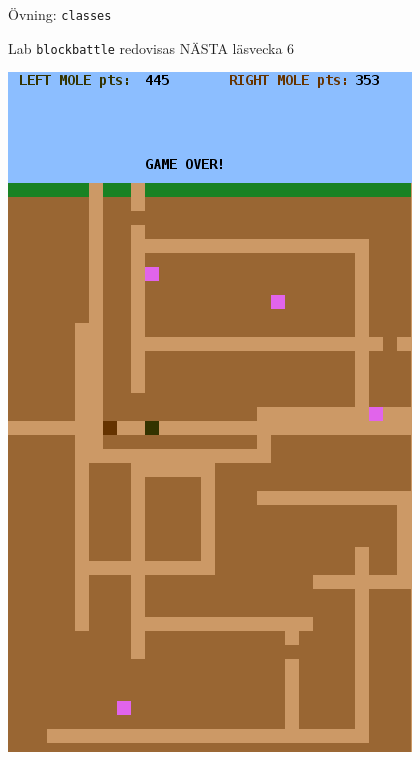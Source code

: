 

\ifkompendium\else

\begin{SlideExtra}{Övning: \texttt{classes}}
\begin{itemize}\SlideFontSmall

\end{itemize}
\end{SlideExtra}

\begin{SlideExtra}{Lab \texttt{blockbattle} redovisas NÄSTA läsvecka 6}
  \begin{minipage}{0.42\textwidth}
        \includegraphics[height=0.8\textheight]{../img/blockbattle.png}
  \end{minipage}%
  \begin{minipage}{0.59\textwidth}

\end{minipage}
\end{SlideExtra}
